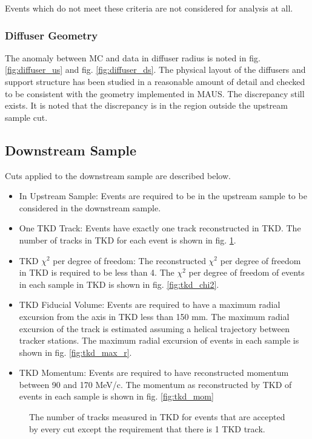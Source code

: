 Events which do not meet these criteria are not considered for analysis at all.

\subsubsection{Diffuser Geometry}

The anomaly between MC and data in diffuser radius is noted in 
fig. \ref{fig:diffuser_us} and fig. \ref{fig:diffuser_ds}. The physical layout of the 
diffusers and support structure has been studied in a reasonable amount of detail and checked 
to be consistent with the geometry implemented in  MAUS. The discrepancy still 
exists. It is noted that the discrepancy is in the region outside the upstream
sample cut.

\clearpage

\subsection{Downstream Sample}
Cuts applied to the downstream sample are described below.

\begin{itemize}
\item{In Upstream Sample:} Events are required to be in the upstream sample to
be considered in the downstream sample.
\item{One TKD Track:} Events have exactly one track reconstructed in TKD. The 
number of tracks in TKD for each event is shown in fig. \ref{fig:tkd_n_tracks}.
\item{TKD $\chi^2$ per degree of freedom:} The reconstructed $\chi^2$ per degree of freedom in TKD is 
required to be less than 4. The $\chi^2$ per degree of freedom of events in 
each sample in TKD is shown in fig. \ref{fig:tkd_chi2}.
\item{TKD Fiducial Volume:} Events are required to have a maximum radial excursion 
from the axis in TKD less than 150 mm. The maximum radial excursion of the track 
is estimated assuming a helical trajectory between tracker stations. The maximum 
radial excursion of events in each sample is shown in fig. \ref{fig:tkd_max_r}.
\item{TKD Momentum:} Events are required to have reconstructed momentum between 
90 and 170  MeV/c. The momentum as reconstructed by TKD of events in each 
sample is shown in fig. \ref{fig:tkd_mom}
\end{itemize}


\begin{figure}[!tbh]
    \centering
    {The number of tracks measured in TKD for events that are accepted by every cut 
     except the requirement that there is 1 TKD track. \label{fig:tkd_n_tracks}}
\end{figure}

